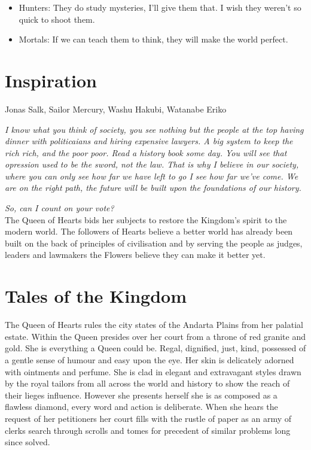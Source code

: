 \begin{itemize}
\item Hunters: They do study mysteries, I'll give them that. I wish they weren't so quick to shoot them.
\item Mortals: If we can teach them to think, they will make the world perfect.
\end{itemize}

\section*{Inspiration}
Jonas Salk, Sailor Mercury, Washu Hakubi, Watanabe Eriko

\newpage{}

\noindent\textit{I know what you think of society, you see nothing but the people at the top having dinner with politicaians and hiring expensive lawyers. A big system to keep the rich rich, and the poor poor. Read a history book some day. You will see that opression used to be the sword, not the law. That is why I believe in our society, where you can only see how far we have left to go I see how far we've come. We are on the right path, the future will be built upon the foundations of our history.}

\textit{So, can I count on your vote?}\\

\noindent The Queen of Hearts bids her subjects to restore the Kingdom's spirit to the modern world. The followers of Hearts believe a better world has already been built on the back of principles of civilisation and by serving the people as judges, leaders and lawmakers the Flowers believe they can make it better yet. 

\section*{Tales of the Kingdom}

The Queen of Hearts rules the city states of the Andarta Plains from her palatial estate. Within the Queen presides over her court from a throne of red granite and gold. She is everything a Queen could be. Regal, dignified, just, kind, possessed of a gentle sense of humour and easy upon the eye. Her skin is delicately adorned with ointments and perfume. She is clad in elegant and extravagant styles drawn by the royal tailors from all across the world and history to show the reach of their lieges influence. However she presents herself she is as composed as a flawless diamond, every word and action is deliberate. When she hears the request of her petitioners her court fills with the rustle of paper as an army of clerks search through scrolls and tomes for precedent of similar problems long since solved.

